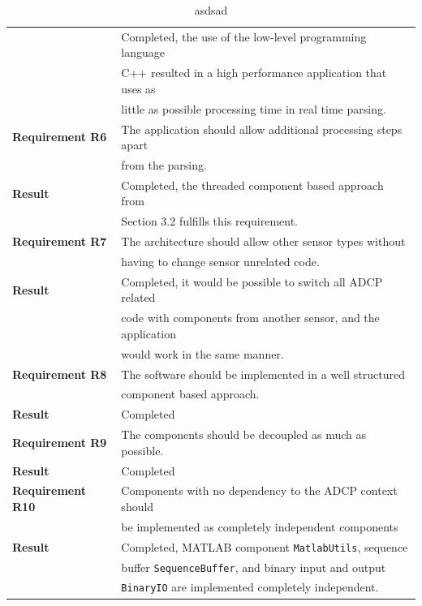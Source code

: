 \begin{table}[ht]
\begin{tabular}{|l|l|}
	  	& Completed, the use of the low-level programming language\\
	  	& C++ resulted in a high performance application that uses as\\
	  	& little as possible processing time in real time parsing. \\
	  \hline
	  \hline
	  	\textbf{Requirement R6} 
	  	& The application should allow additional processing steps apart\\
	  	& from the parsing.\\ \hline
	  	\textbf{Result} 
	  	& Completed, the threaded component based approach from\\
	  	& Section 3.2 fulfills this requirement.\\
	  \hline
	  \hline
	  	\textbf{Requirement R7} 
	  	& The architecture should allow other sensor types without\\
	  	& having to change sensor unrelated code.\\ \hline
	  	\textbf{Result} 
	  	& Completed, it would be possible to switch all ADCP related\\
	  	& code with components from another sensor, and the application\\
	  	& would work in the same manner.\\
	  \hline
	  \hline
	  	\textbf{Requirement R8} 
	  	& The software should be implemented in a well structured\\
	  	& component based approach.\\ \hline
	  	\textbf{Result} & Completed \\
	  \hline
	  \hline
	  	\textbf{Requirement R9} & The components should be decoupled as much as possible.\\ \hline
	  	\textbf{Result} & Completed \\
	  \hline
	  \hline
	  	\textbf{Requirement R10} 
	  	& Components with no dependency to the ADCP context should\\
	  	& be implemented as completely independent components\\ \hline
	  	\textbf{Result} 
	  	& Completed, MATLAB component \texttt{MatlabUtils}, sequence\\
	  	& buffer \texttt{SequenceBuffer}, and binary input and output\\
	  	& \texttt{BinaryIO} are implemented completely independent.\\
	  \hline
	\end{tabular}
	\caption{asdsad}
\end{table}

